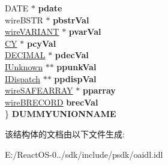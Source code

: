 \begin{DoxyCompactItemize}
\begin{tabbing}
\>DATE $\ast$ {\bfseries pdate}\\
\>wireBSTR $\ast$ {\bfseries pbstrVal}\\
\>\hyperlink{struct_i_ole_automation_types_1_1__wire_v_a_r_i_a_n_t}{wireVARIANT} $\ast$ {\bfseries pvarVal}\\
\>\hyperlink{uniontag_c_y}{CY} $\ast$ {\bfseries pcyVal}\\
\>\hyperlink{structtag_d_e_c}{DECIMAL} $\ast$ {\bfseries pdecVal}\\
\>\hyperlink{interface_i_unknown}{IUnknown} $\ast$$\ast$ {\bfseries ppunkVal}\\
\>\hyperlink{interface_i_dispatch}{IDispatch} $\ast$$\ast$ {\bfseries ppdispVal}\\
\>\hyperlink{struct_i_ole_automation_types_1_1__wire_s_a_f_e_a_r_r_a_y}{wireSAFEARRAY} $\ast$ {\bfseries pparray}\\
\>\hyperlink{struct_i_ole_automation_types_1_1__wire_b_r_e_c_o_r_d}{wireBRECORD} {\bfseries brecVal}\\
\} {\bfseries DUMMYUNIONNAME}\\

\end{tabbing}\end{DoxyCompactItemize}


该结构体的文档由以下文件生成\+:\begin{DoxyCompactItemize}
\item 
E\+:/\+React\+O\+S-\/0../sdk/include/psdk/oaidl.\+idl\end{DoxyCompactItemize}
